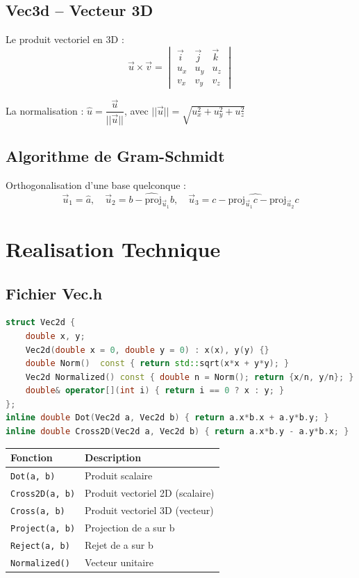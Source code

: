 \documentclass[12pt,a4paper]{article}
\begin{document}
\subsection{Vec3d -- Vecteur 3D}

Le produit vectoriel en 3D :
\[
    \vec{u} \times \vec{v} = \begin{vmatrix} \vec{i} & \vec{j} & \vec{k} \\ u_x & u_y & u_z \\ v_x & v_y & v_z \end{vmatrix}
\]

La normalisation : $\hat{u} = \dfrac{\vec{u}}{||\vec{u}||}$, avec $||\vec{u}|| = \sqrt{u_x^2 + u_y^2 + u_z^2}$

\subsection{Algorithme de Gram-Schmidt}

Orthogonalisation d'une base quelconque :
\[
    \vec{u}_1 = \hat{a}, \quad \vec{u}_2 = \widehat{b - \text{proj}_{\vec{u}_1} b}, \quad \vec{u}_3 = \widehat{c - \text{proj}_{\vec{u}_1} c - \text{proj}_{\vec{u}_2} c}
\]

\section{Realisation Technique}

\subsection{Fichier Vec.h}

\begin{lstlisting}[language=C++, caption=Structure Vec2d]
struct Vec2d {
    double x, y;
    Vec2d(double x = 0, double y = 0) : x(x), y(y) {}
    double Norm()  const { return std::sqrt(x*x + y*y); }
    Vec2d Normalized() const { double n = Norm(); return {x/n, y/n}; }
    double& operator[](int i) { return i == 0 ? x : y; }
};
inline double Dot(Vec2d a, Vec2d b) { return a.x*b.x + a.y*b.y; }
inline double Cross2D(Vec2d a, Vec2d b) { return a.x*b.y - a.y*b.x; }
\end{lstlisting}

\begin{center}
\begin{tabular}{ll}
    \toprule
    \textbf{Fonction} & \textbf{Description} \\
    \midrule
    \texttt{Dot(a, b)} & Produit scalaire \\
    \texttt{Cross2D(a, b)} & Produit vectoriel 2D (scalaire) \\
    \texttt{Cross(a, b)} & Produit vectoriel 3D (vecteur) \\
    \texttt{Project(a, b)} & Projection de a sur b \\
    \texttt{Reject(a, b)} & Rejet de a sur b \\
    \texttt{Normalized()} & Vecteur unitaire \\
    \bottomrule
\end{tabular}
\end{center}
\end{document}
